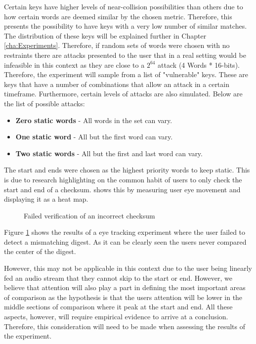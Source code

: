 Certain keys have higher levels of near-collision possibilities than others due to how certain words are deemed similar by the chosen metric. Therefore, this presents the possibility to have keys with a very low number of similar matches. The distribution of these keys will be explained further in Chapter \ref{cha:Experiments}. Therefore, if random sets of words were chosen with no restraints there are attacks presented to the user that in a real setting would be infeasible in this context as they are close to a $2^{64}$ attack (4 Words * 16-bits). Therefore, the experiment will sample from a list of "vulnerable" keys. These are keys that have a number of combinations that allow an attack in a certain timeframe. Furthermore, certain levels of attacks are also simulated. Below are the list of possible attacks:

\begin{itemize}
    \item \textbf{Zero static words} - All words in the set can vary.
    \item \textbf{One static word} - All but the first word can vary.
    \item \textbf{Two static words} - All but the first and last word can vary.
\end{itemize}

The start and ends were chosen as the highest priority words to keep static. This is due to research highlighting on the common habit of users to only check the start and end of a checksum. \cite{cherubini2018towards} shows this by measuring user eye movement and displaying it as a heat map.

\begin{figure}[h!]
    \centering
    \caption{Failed verification of an incorrect checksum\cite{cherubini2018towards}}
    \label{fig:heatMap}
\end{figure}

Figure \ref{fig:heatMap} shows the results of a eye tracking experiment where the user failed to detect a mismatching digest. As it can be clearly seen the users never compared the center of the digest. 

However, this may not be applicable in this context due to the user being linearly fed an audio stream that they cannot skip to the start or end. However, we believe that attention will also play a part in defining the most important areas of comparison as the hypothesis is that the users attention will be lower in the middle sections of comparison where it peak at the start and end. All these aspects, however, will require empirical evidence to arrive at a conclusion. Therefore, this consideration will need to be made when assessing the results of the experiment.

